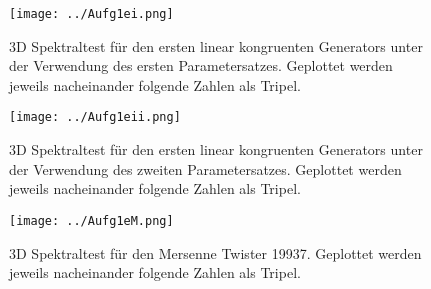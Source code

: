 \begin{figure}
	\centering
	\texttt{[image: ../Aufg1ei.png]}
	\caption{3D Spektraltest für den ersten linear kongruenten Generators unter der Verwendung des ersten Parametersatzes. Geplottet werden jeweils nacheinander folgende Zahlen als Tripel.}
	\label{e1}
\end{figure}

\begin{figure}
	\centering
	\texttt{[image: ../Aufg1eii.png]}
	\caption{3D Spektraltest für den ersten linear kongruenten Generators unter der Verwendung des zweiten Parametersatzes. Geplottet werden jeweils nacheinander folgende Zahlen als Tripel.}
	\label{e2}
\end{figure}

\begin{figure}
	\centering
	\texttt{[image: ../Aufg1eM.png]}
	\caption{3D Spektraltest für den Mersenne Twister 19937. Geplottet werden jeweils nacheinander folgende Zahlen als Tripel.}
	\label{e3}
\end{figure}